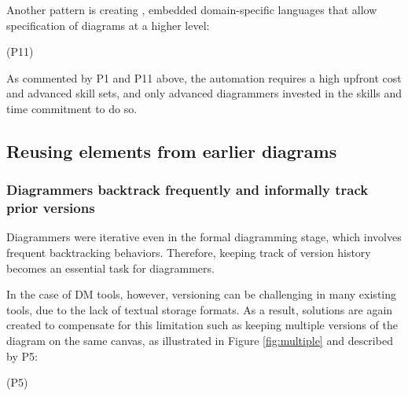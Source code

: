 Another pattern is creating , embedded domain-specific languages that allow specification of diagrams at a higher level:

     (P11)
 
As commented by P1 and P11 above, the automation requires a high upfront cost and advanced skill sets, and only advanced diagrammers invested in the skills and time commitment to do so.



\subsection{Reusing elements from earlier diagrams}

\subsubsection{Diagrammers backtrack frequently and informally track prior versions}
Diagrammers were iterative even in the formal diagramming stage, which involves frequent backtracking behaviors. Therefore, keeping track of version history becomes an essential task for diagrammers. 

In the case of DM tools, however, versioning can be challenging in many existing tools, due to the lack of textual storage formats. As a result,  solutions are again created to compensate for this limitation such as keeping multiple versions of the diagram on the same canvas, as illustrated in Figure \ref{fig:multiple} and described by P5: 

     (P5) 

